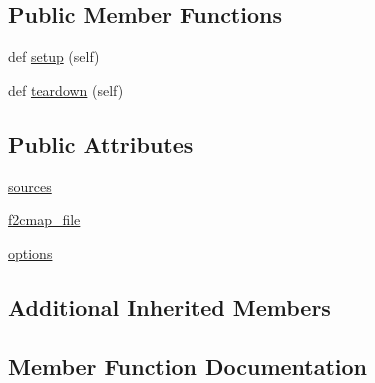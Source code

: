 \subsection*{Public Member Functions}
\begin{DoxyCompactItemize}
\item 
def \hyperlink{classnumpy_1_1f2py_1_1tests_1_1test__assumed__shape_1_1TestF2cmapOption_a21106364c3bc8a2df4683aa5237fd6b1}{setup} (self)
\item 
def \hyperlink{classnumpy_1_1f2py_1_1tests_1_1test__assumed__shape_1_1TestF2cmapOption_a9a4e4b893b11aa30ec49888defec8d06}{teardown} (self)
\end{DoxyCompactItemize}
\subsection*{Public Attributes}
\begin{DoxyCompactItemize}
\item 
\hyperlink{classnumpy_1_1f2py_1_1tests_1_1test__assumed__shape_1_1TestF2cmapOption_a92cd57a46d1e95fd8d1340c345cbab53}{sources}
\item 
\hyperlink{classnumpy_1_1f2py_1_1tests_1_1test__assumed__shape_1_1TestF2cmapOption_a329a09d96dfd672e2ef42d2be047061b}{f2cmap\+\_\+file}
\item 
\hyperlink{classnumpy_1_1f2py_1_1tests_1_1test__assumed__shape_1_1TestF2cmapOption_aa42985500a2cddb7254530f8829bda5d}{options}
\end{DoxyCompactItemize}
\subsection*{Additional Inherited Members}


\subsection{Member Function Documentation}
\mbox{\label{classnumpy_1_1f2py_1_1tests_1_1test__assumed__shape_1_1TestF2cmapOption_a21106364c3bc8a2df4683aa5237fd6b1}} 
